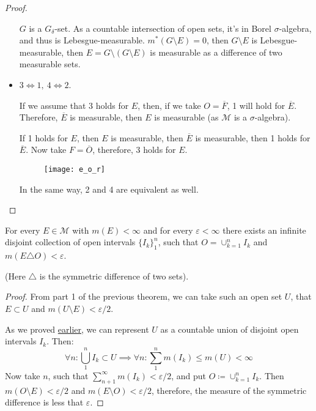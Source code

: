 \begin{proof}
\begin{itemize}
{            $G$ is a $G_\delta$-set. As a countable intersection of open sets,
            it's in Borel $\sigma$-algebra, and thus is Lebesgue-measurable.
            $m^*(G \setminus E) = 0$, then $G \setminus E$ is Lebesgue-measurable,
            then $E = G \setminus (G \setminus E)$ is measurable as
            a difference of two measurable sets.
        }
        \item {
            $3 \Longleftrightarrow 1,\ 4 \Longleftrightarrow 2$.

            If we assume that 3 holds for $E$, then, if we take $O = \overline{F}$,
            1 will hold for $\overline{E}$.
            Therefore, $\overline{E}$ is measurable, then $E$ is measurable
            (as $\mathcal{M}$ is a $\sigma$-algebra).

            If 1 holds for $E$, then $E$ is measurable, then $\overline{E}$ is measurable, then 1 holds for 
            $\overline{E}$. Now take $F = \overline{O}$, therefore, 3 holds for $E$.

            \begin{figure*}[h]
                \centering
                \texttt{[image: e\_o\_r]}
            \end{figure*}

            In the same way, 2 and 4 are equivalent as well.
        }
    \end{itemize}
\end{proof}

\begin{theorem}
    For every $E \in \mathcal{M}$ with $m(E) < \infty$ and for every
    $\varepsilon < \infty$ there exists an infinite disjoint collection of open intervals
    $\{I_k\}_1^n$, such that $O = \cup_{k=1}^n I_k$ and $m(E \triangle O) < \varepsilon$.

    (Here $\triangle$ is the symmetric difference of two sets).
\end{theorem}
\begin{proof}
    From part 1 of the previous theorem,
    we can take such an open set $U$, that $E \subset U$ and $m(U \setminus E) < \varepsilon / 2$. 
    
    As we proved \hyperref[prop:bIsSmallestSigmaAlgebra]{earlier}, 
    we can represent $U$ as a countable union of disjoint open intervals $I_k$. Then:
    \[
        \forall n: \bigcup_1^n I_k \subset U \implies \forall n:
        \sum_1^n m(I_k) \le m(U) < \infty
    \]
    Now take $n$, such that $\sum_{n+1}^\infty m(I_k) < \varepsilon / 2$, and put
    $O \coloneqq \cup_{k=1}^n I_k$.
    Then $m(O \setminus E) < \varepsilon / 2$ and $m(E \setminus O) < \varepsilon / 2$,
    therefore, the measure of the symmetric difference is less that $\varepsilon$.
\end{proof}

